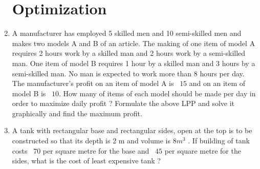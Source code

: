 \documentclass{article}
\begin{document}
\begin{enumerate}
\section{Optimization}
\item A manufacturer has employed 5 skilled men and 10 semi-skilled men and makes two models A and B of an article. The making of one item of model A requires 2 hours work by a skilled man and 2 hours work by a semi-skilled man. One item of model B requires 1 hour by a skilled man and 3 hours by a semi-skilled man. No man is expected to work more than 8 hours per day. The manufacturer’s profit on an item of model A is \rupee~$15$ and on an item of model B is \rupee~$10$. How many of items of each model should be made per day in order to maximize daily profit ? Formulate the above LPP and solve it graphically and find the maximum profit.
\item A tank with rectangular base and rectangular sides, open at the top is to be constructed so that its depth is 2 m and volume is $8 m^3$ . If building of tank costs \rupee~${70}$ per square metre for the base and \rupee~${45}$ per square metre for the sides, what is the cost of least expensive tank ?
\end{enumerate}
\end{document}
